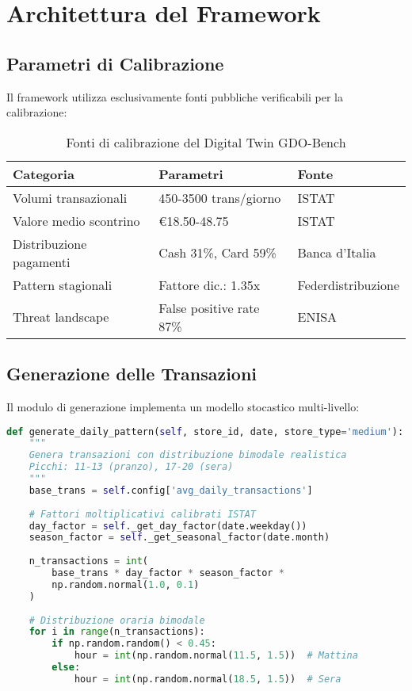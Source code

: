 \section{Architettura del Framework}

\subsection{Parametri di Calibrazione}

Il framework utilizza esclusivamente fonti pubbliche verificabili per la calibrazione:

\begin{table}[htbp]
\centering
\caption{Fonti di calibrazione del Digital Twin GDO-Bench}
\label{tab:calibration-sources}
\begin{tabular}{lll}
\toprule
\textbf{Categoria} & \textbf{Parametri} & \textbf{Fonte} \\
\midrule
Volumi transazionali & 450-3500 trans/giorno & ISTAT\cite{istat2024} \\
Valore medio scontrino & €18.50-48.75 & ISTAT\cite{istat2023} \\
Distribuzione pagamenti & Cash 31\%, Card 59\% & Banca d'Italia\cite{bancaitalia2024} \\
Pattern stagionali & Fattore dic.: 1.35x & Federdistribuzione\cite{federdist2023} \\
Threat landscape & False positive rate 87\% & ENISA\cite{enisa2024threat} \\
\bottomrule
\end{tabular}
\end{table}

\subsection{Generazione delle Transazioni}

Il modulo di generazione implementa un modello stocastico multi-livello:

\begin{lstlisting}[language=Python, caption=Generazione pattern transazionale bimodale, label=lst:transaction-gen]
def generate_daily_pattern(self, store_id, date, store_type='medium'):
    """
    Genera transazioni con distribuzione bimodale realistica
    Picchi: 11-13 (pranzo), 17-20 (sera)
    """
    base_trans = self.config['avg_daily_transactions']
    
    # Fattori moltiplicativi calibrati ISTAT
    day_factor = self._get_day_factor(date.weekday())
    season_factor = self._get_seasonal_factor(date.month)
    
    n_transactions = int(
        base_trans * day_factor * season_factor * 
        np.random.normal(1.0, 0.1)
    )
    
    # Distribuzione oraria bimodale
    for i in range(n_transactions):
        if np.random.random() < 0.45:
            hour = int(np.random.normal(11.5, 1.5))  # Mattina
        else:
            hour = int(np.random.normal(18.5, 1.5))  # Sera
\end{lstlisting}

